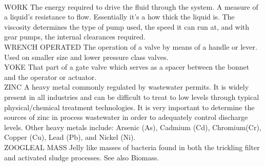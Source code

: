 \documentclass{article}
\begin{document}
\vspace{0.3cm}\\
WORK
The energy required to drive the fluid through the system.  A measure of a liquid’s resistance to flow. Essentially it’s a how thick the liquid is. The viscosity determines the type of pump used, the speed it can run at, and with gear pumps, the internal clearances required.
\vspace{0.3cm}\\
WRENCH OPERATED
The operation of a valve by means of a handle or lever. Used on smaller size and lower pressure class valves.
\vspace{0.3cm}\\
YOKE
That part of a gate valve which serves as a spacer between the bonnet and the operator or actuator.
\vspace{0.3cm}\\
ZINC
A heavy metal commonly regulated by wastewater permits. It is widely present in all industries and can be difficult to treat to low levels through typical physical/chemical treatment technologies.  It is very important to determine the sources of zinc in process wastewater in order to adequately control discharge levels.  Other heavy metals include: Arsenic (As), Cadmium (Cd), Chromium(Cr), Copper (Cu), Lead (Pb), and Nickel (Ni).
\vspace{0.3cm}\\
ZOOGLEAL MASS
Jelly like masses of bacteria found in both the trickling filter and activated sludge processes. See also Biomass.
\vspace{0.3cm}\\
\end{document}
